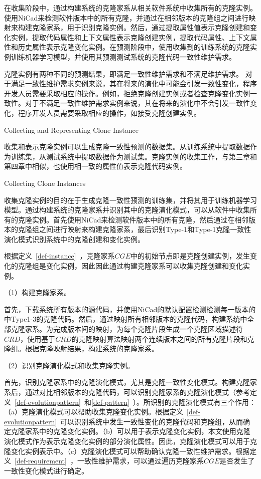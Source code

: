 在收集阶段中，通过构建系统的克隆家系从相关软件系统中收集所有的克隆实例。使用NiCad来检测软件版本中的所有克隆，并通过在相邻版本的克隆组之间进行映射来构建克隆家系，用于识别克隆实例。然后，通过提取属性值表示克隆创建和变化实例，提取代码属性和上下文属性表示克隆创建实例，提取代码属性、上下文属性和历史属性表示克隆变化实例。在预测阶段中，使用收集到的训练系统的克隆实例训练机器学习模型，并使用其预测测试系统的克隆代码一致性维护需求。

克隆实例有两种不同的预测结果，即满足一致性维护需求和不满足维护需求。
对于满足一致性维护需求实例来说，其在将来的演化中可能会引发一致性变化，程序开发人员需要采取相应的操作。例如，拒绝克隆创建实例或者检查克隆变化实例一致性。对于不满足一致性维护需求实例来说，其在将来的演化中不会引发一致性变化，程序开发人员需要采取相应的操作，如接受克隆创建实例。

{Collecting and Representing Clone Instance}

收集和表示克隆实例可以生成克隆一致性预测的数据集。从训练系统中提取数据作为训练集，从测试系统中提取数据作为测试集。克隆实例的收集工作，与第三章和第四章中相似，也使用相一致的属性值表示克隆代码实例。

{Collecting Clone Instances}

收集克隆实例的目的在于生成克隆一致性预测的训练集，并将其用于训练机器学习模型。通过构建系统的克隆家系并识别其中的克隆演化模式，可以从软件中收集所有的克隆实例。首先使用NiCad来检测软件版本中的所有克隆，然后通过在相邻版本的克隆组之间进行映射来构建克隆家系，最后识别Type-1和Type-1克隆一致性演化模式识别系统中的克隆创建和变化实例。

根据定义~\ref{def-instance}~，克隆家系$CGE$中的初始节点即是克隆创建实例，发生变化的克隆组是变化实例，因此因此通过构建克隆家系可以收集克隆创建和变化实例。

（1）构建克隆家系。

首先，下载系统所有版本的源代码，并使用NiCad的默认配置检测检测每一版本的中Type1-3的克隆代码。然后，通过映射所有相邻版本的克隆代码，构建系统中全部克隆家系。为完成版本间的映射，为每个克隆片段生成一个克隆区域描述符 $CRD$\cite{duala2010clone}，使用基于$CRD$的克隆映射算法映射两个连续版本之间的所有克隆片段和克隆组\cite{ci2013new}\cite{ci2013newD}。根据克隆映射结果，构建系统的克隆家系。

（2）识别克隆演化模式和收集克隆实例。

首先，识别克隆家系中的克隆演化模式，尤其是克隆一致性变化模式。构建克隆家系后，通过对比相邻版本的克隆代码，可以识别克隆家系的克隆演化模式（参考定义~\ref{def-evolutionpattern}~和\ref{def-pattern}~）。所识别的克隆演化模式有三个作用：（a）克隆演化模式可以帮助收集克隆变化实例。根据定义~\ref{def-evolutionpattern}~可以识别系统中发生一致性变化的克隆代码和克隆组，从而确定克隆家系中的克隆变化实例。（b）可以用于表示克隆变化实例，本文使用克隆演化模式作为表示克隆变化实例的部分演化属性。因此，克隆演化模式可以用于克隆变化实例表示中。（c）克隆演化模式可以帮助确认克隆一致性维护需求。根据定义~\ref{def-requirement}~，一致性维护需求，可以通过遍历克隆家系$CGE$是否发生了一致性变化模式进行确定。

